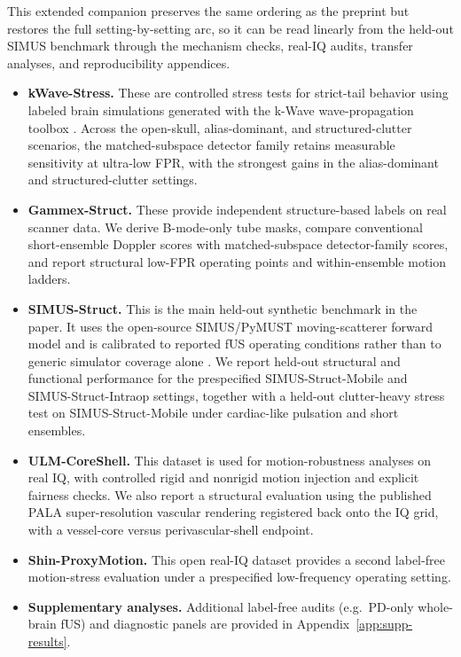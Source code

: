 \documentclass[11pt]{article}
\newif\ifPAPERONLY
\newcommand{\SuppOrApp}[1]{\ifPAPERONLY Supplementary Material\else Appendix~\ref{#1}\fi}
\begin{document}
\ifPAPERONLY
\else
This extended companion preserves the same ordering as the preprint but restores the full setting-by-setting arc, so it can be read linearly from the held-out SIMUS benchmark through the mechanism checks, real-IQ audits, transfer analyses, and reproducibility appendices.
\begin{itemize}[nosep]
  \item \textbf{kWave-Stress.} These are controlled stress tests for strict-tail behavior using labeled brain simulations generated with the k-Wave wave-propagation toolbox \cite{TreebyCoxKWave2010}. Across the open-skull, alias-dominant, and structured-clutter scenarios, the matched-subspace detector family retains measurable sensitivity at ultra-low FPR, with the strongest gains in the alias-dominant and structured-clutter settings.
  \item \textbf{Gammex-Struct.} These provide independent structure-based labels on real scanner data. We derive B-mode-only tube masks, compare conventional short-ensemble Doppler scores with matched-subspace detector-family scores, and report structural low-FPR operating points and within-ensemble motion ladders.
  \item \textbf{SIMUS-Struct.} This is the main held-out synthetic benchmark in the paper. It uses the open-source SIMUS/PyMUST moving-scatterer forward model and is calibrated to reported fUS operating conditions rather than to generic simulator coverage alone \cite{GarciaSIMUSPartI2022,CigierSIMUSPartII2022,UrbanWholeBrain2015,Deffieux2021,Soloukey2020FUSAwake,Rabut2024}. We report held-out structural and functional performance for the prespecified SIMUS-Struct-Mobile and SIMUS-Struct-Intraop settings, together with a held-out clutter-heavy stress test on SIMUS-Struct-Mobile under cardiac-like pulsation and short ensembles.
  \item \textbf{ULM-CoreShell.} This dataset is used for motion-robustness analyses on real IQ, with controlled rigid and nonrigid motion injection and explicit fairness checks. We also report a structural evaluation using the published PALA super-resolution vascular rendering registered back onto the IQ grid, with a vessel-core versus perivascular-shell endpoint.
  \item \textbf{Shin-ProxyMotion.} This open real-IQ dataset provides a second label-free motion-stress evaluation under a prespecified low-frequency operating setting.
  \item \textbf{Supplementary analyses.} Additional label-free audits (e.g.\ PD-only whole-brain fUS) and diagnostic panels are provided in \SuppOrApp{app:supp-results}.
\end{itemize}
\fi
\end{document}
